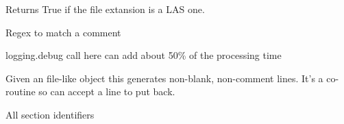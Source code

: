 \documentclass[letterpaper,10pt,english]{sphinxmanual}
\begin{document}

\begin{fulllineitems}
\label{\detokenize{ref/LAS/core/LASRead:TotalDepth.LAS.core.LASRead.hasLASExtension}}
Returns True if the file extansion is a LAS one.

\end{fulllineitems}


\begin{fulllineitems}
\label{\detokenize{ref/LAS/core/LASRead:TotalDepth.LAS.core.LASRead.RE_COMMENT}}
Regex to match a comment

\end{fulllineitems}


\begin{fulllineitems}
\label{\detokenize{ref/LAS/core/LASRead:TotalDepth.LAS.core.LASRead.DEBUG_LINE_BY_LINE}}
logging.debug call here can add about 50\% of the processing time

\end{fulllineitems}


\begin{fulllineitems}
\label{\detokenize{ref/LAS/core/LASRead:TotalDepth.LAS.core.LASRead.genLines}}
Given an file-like object this generates non-blank, non-comment lines.
It’s a co-routine so can accept a line to put back.

\end{fulllineitems}


\begin{fulllineitems}
\label{\detokenize{ref/LAS/core/LASRead:TotalDepth.LAS.core.LASRead.SECT_TYPES}}
All section identifiers

\end{fulllineitems}
\end{document}
